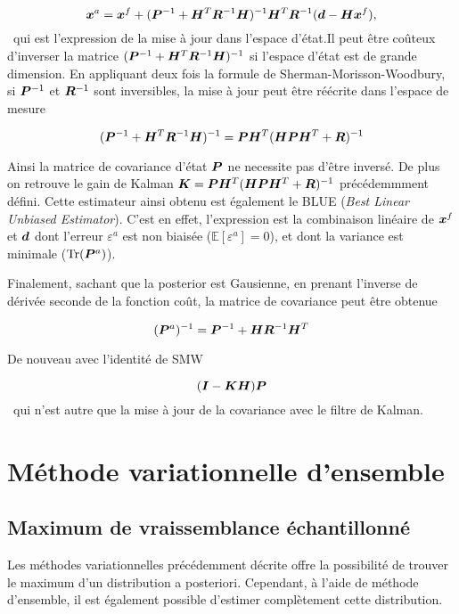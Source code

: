 \begin{equation*}
    \bm{x}^a = \bm{x}^f + (\bm{P}^{-1} + \bm{H}^T \bm{R}^{-1} \bm{H})^{-1} \bm{H}^T \bm{R}^{-1} (\bm{d} - \bm{H} \bm{x}^f),
\end{equation*}~qui est l'expression de la mise à jour dans l'espace d'état.Il peut être coûteux d'inverser la matrice $(\bm{P}^{-1} + \bm{H}^T \bm{R}^{-1} \bm{H})^{-1}$ si l'espace d'état est de grande dimension. En appliquant deux fois la formule de Sherman-Morisson-Woodbury, si $\bm{P}^{-1}$ et $\bm{R}^{-1}$ sont inversibles, la mise à jour peut être réécrite dans l'espace de mesure

\begin{equation*}
    (\bm{P}^{-1} + \bm{H}^T \bm{R}^{-1} \bm{H})^{-1} = \bm{P} \bm{H}^T (\bm{H} \bm{P} \bm{H}^T + \bm{R})^{-1}
\end{equation*}

Ainsi la matrice de covariance d'état $\bm{P}$ ne necessite pas d'être inversé. De plus on retrouve le gain de Kalman $\bm{K} = \bm{P} \bm{H}^T (\bm{H} \bm{P} \bm{H}^T + \bm{R})^{-1}$ précédemmment défini. Cette estimateur ainsi obtenu est également le BLUE (\textit{Best Linear Unbiased Estimator}). C'est en effet, l'expression est la combinaison linéaire de $\bm{x}^f$ et $\bm{d}$ dont l'erreur $\varepsilon^a$ est non biaisée ($\mathbb{E}[\varepsilon^a] = 0$), et dont la variance est minimale ($\operatorname{Tr}(\bm{P}^a)$).

Finalement, sachant que la posterior est Gausienne, en prenant l'inverse de dérivée seconde de la fonction coût, la matrice de covariance peut être obtenue

\begin{equation*}
    (\bm{P}^a)^{-1} = \bm{P}^{-1} + \bm{H} \bm{R}^{-1} \bm{H}^T
\end{equation*}

De nouveau avec l'identité de SMW

\begin{equation*}
    (\bm{I} - \bm{K} \bm{H}) \bm{P}
\end{equation*}~qui n'est autre que la mise à jour de la covariance avec le filtre de Kalman.

\section{Méthode variationnelle d'ensemble}

\subsection{Maximum de vraissemblance échantillonné}
Les méthodes variationnelles précédemment décrite offre la possibilité de trouver le maximum d'un distribution a posteriori. Cependant, à l'aide de méthode d'ensemble, il est également possible d'estimer complètement cette distribution.

